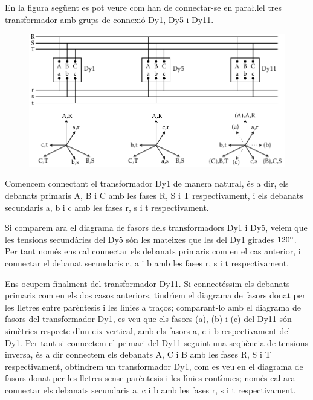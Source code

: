 \begin{exemple}
    En la figura seg\"{u}ent es pot veure com han de connectar-se en para{\l.l}el tres transformador amb grups de connexi\'{o} Dy1, Dy5 i Dy11.
    \begin{figure}[h]
    \centering
        \includegraphics{Imatges/Cap-TrafosPot-Exemple-TR-parallel.pdf}
    \end{figure}

    Comencem connectant el  transformador Dy1 de manera natural, \'{e}s a dir, els debanats primaris A, B i C amb les fases R, S i T respectivament, i els debanats secundaris a, b i c amb les fases r, s i t respectivament.

    Si comparem ara el diagrama de fasors dels transformadors Dy1 i Dy5, veiem que les tensions secund\`{a}ries del Dy5 s\'{o}n les mateixes que les del Dy1 girades $120^\circ$. Per tant nom\'{e}s ens cal connectar els debanats primaris com en el cas anterior, i connectar el debanat secundaris c, a i b amb les fases r, s i t respectivament.

    Ens ocupem finalment del transformador Dy11. Si connect\'{e}ssim els debanats primaris com en els dos casos anteriors, tindr\'{\i}em el diagrama de fasors donat per les lletres entre par\`{e}ntesis i les l\'{\i}nies a tra\c{c}os; comparant-lo amb el diagrama de fasors del transformador Dy1, es veu que els fasors (a), (b) i (c) del Dy11 s\'{o}n sim\`{e}trics respecte d'un eix vertical, amb els fasors a, c i b respectivament del Dy1. Per tant si connectem el primari del Dy11 seguint una seq\"{u}\`{e}ncia de tensions inversa, \'{e}s a dir connectem els debanats A, C i B amb les fases R, S i T respectivament, obtindrem un transformador Dy1, com es veu en el diagrama de fasors donat per les lletres sense par\`{e}ntesis i les l\'{\i}nies cont\'{\i}nues; nom\'{e}s cal ara connectar els debanats secundaris a, c i b amb les fases r, s i t respectivament.
\end{exemple}

